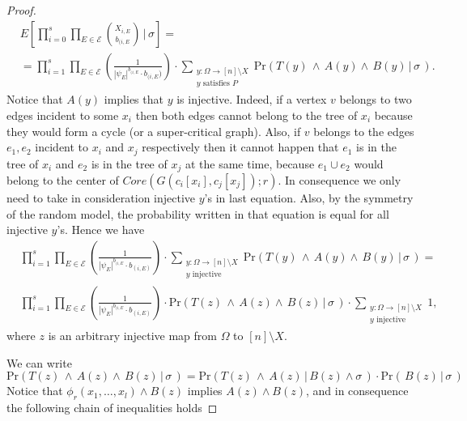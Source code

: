 \documentclass[11pt,notitlepage,a4paper]{article}
\theoremstyle{definition}
\begin{document}
\begin{proof}
	\begin{align} \nonumber
		& E\left[\prod_{i=0}^{s}\prod_{E\in \mathcal{E}}
		\binom{X_{i,E}}{b_{(i,E}} \, \bigg|\, \sigma \right]= \\
		&=\prod_{i=1}^{s}
		\prod_{E\in \mathcal{E}} \left(\frac{1}{|\psi_E|^{b_{(i,E}} \cdot b_{(i,E})}\right) \cdot
		\sum_{\substack{y:\Omega \rightarrow [n]\setminus X\\ 
		y \text{ satisfies } P}} 
		\mathrm{Pr}( T(y) \, \wedge \, A(y) \wedge \, B(y) \, | \, \sigma \, ).		
	\end{align} 
	Notice that $A(y)$ implies that $y$ is injective. Indeed, if a vertex
	$v$ belongs to two edges incident to some $x_i$ then both edges cannot
	belong to the tree of $x_i$ because they would form a cycle (or a super-critical graph). Also, if $v$ belongs to the edges $e_1, e_2$
	incident to $x_i$ and $x_j$ respectively then it cannot happen that
	$e_1$ is in the tree of $x_i$ and $e_2$ is in the tree of $x_j$ at the
	same time, because $e_1\cup e_2$ would belong to the center of 
	$Core(G(c_i[x_i],c_j[x_j]);r)$.
	In consequence we only need to take in consideration injective $y$'s in 
	last equation. Also, by the symmetry of the random model, the probability
	written in that equation is equal for all injective $y$'s. 
	Hence we have
	\begin{align} \nonumber
		& \prod_{i=1}^{s}
		\prod_{E\in \mathcal{E}} \left(\frac{1}{|\psi_E|^{b_{(i,E}} \cdot b_{(i,E)}}\right) \cdot
		\sum_{\substack{y:\Omega \rightarrow [n]\setminus X\\ y \text{ injective}}} 
		\mathrm{Pr}( T(y) \, \wedge \, A(y) \wedge \, B(y) \, | \, \sigma \, )=\\
		& \label{eqn:distributed}
		\prod_{i=1}^{s}
		\prod_{E\in \mathcal{E}} \left(\frac{1}{|\psi_E|^{b_{(i,E}} \cdot b_{(i,E)}}\right) \cdot
		\mathrm{Pr}( T(z) \, \wedge \, A(z) \wedge \, B(z) \, | \, \sigma \, )
		\cdot \sum_{\substack{y:\Omega \rightarrow [n]\setminus X\\ y \text{ injective}}} 1,
	\end{align} 
   	where $z$ is an arbitrary injective map from $\Omega$ to
   	$[n]\setminus X$. \par
	We can write
	\[\mathrm{Pr}( T(z) \, \wedge \, A(z) \wedge \, B(z) \, | \, \sigma \, )=
	\mathrm{Pr}( T(z) \, \wedge \, A(z) \, | \, B(z) \wedge \sigma \, )
	\cdot \mathrm{Pr}( \, B(z) \, | \, \sigma \, )\]
	Notice that $\phi_r(x_1,\dots, x_l)\wedge B(z)$ implies $A(z)\wedge
	B(z)$,	and in consequence the following chain of inequalities holds

\end{proof}
\end{document}
